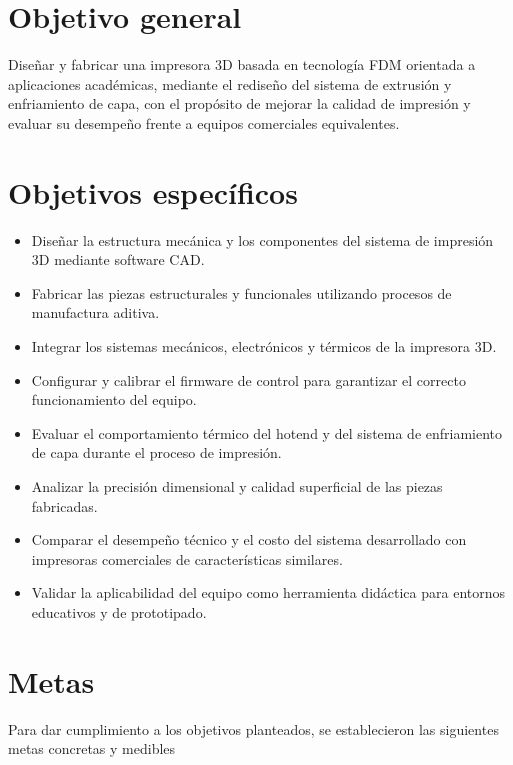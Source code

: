 \section{Objetivo general}
Diseñar y fabricar una impresora 3D basada en tecnología FDM orientada a aplicaciones académicas, mediante el rediseño del sistema de extrusión y enfriamiento de capa, con el propósito de mejorar la calidad de impresión y evaluar su desempeño frente a equipos comerciales equivalentes.

\section{Objetivos específicos}
\begin{itemize}
  \item Diseñar la estructura mecánica y los componentes del sistema de impresión 3D mediante software CAD.
  \item Fabricar las piezas estructurales y funcionales utilizando procesos de manufactura aditiva.
  \item Integrar los sistemas mecánicos, electrónicos y térmicos de la impresora 3D.
  \item Configurar y calibrar el firmware de control para garantizar el correcto funcionamiento del equipo.
  \item Evaluar el comportamiento térmico del hotend y del sistema de enfriamiento de capa durante el proceso de impresión.
  \item Analizar la precisión dimensional y calidad superficial de las piezas fabricadas.
  \item Comparar el desempeño técnico y el costo del sistema desarrollado con impresoras comerciales de características similares.
  \item Validar la aplicabilidad del equipo como herramienta didáctica para entornos educativos y de prototipado.
\end{itemize}

\section{Metas}
Para dar cumplimiento a los objetivos planteados, se establecieron las 
siguientes metas concretas y medibles


